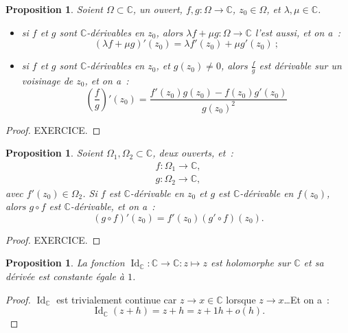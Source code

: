 \documentclass{report}
\newtheorem{prp}[thm]{Proposition}
\theoremstyle{definition}
\theoremstyle{remark}
\numberwithin{equation}{section}
\newcommand{\C}{\mathbb C}
\DeclareMathOperator{\Id}{Id}
\begin{document}
			\begin{prp} Soient $\Omega \subset \C$, un ouvert, $f, g : \Omega \to \C$, $z_0 \in \Omega$, et $\lambda, \mu \in \C$.
			\begin{itemize}
				\item si $f$ et $g$ sont $\C$-dérivables en $z_0$, alors $\lambda f + \mu g : \Omega \to \C$ l'est aussi, et on a~:
				\begin{equation}
					(\lambda f + \mu g)'(z_0) = \lambda f'(z_0) + \mu g'(z_0)~;
				\end{equation}
				\item si $f$ et $g$ sont $\C$-dérivables en $z_0$, et $g(z_0) \neq 0$, alors $\frac fg$ est dérivable sur un voisinage de $z_0$, et on a~:
				\begin{equation}
					\left(\frac fg\right)'(z_0) = \frac {f'(z_0)g(z_0) - f(z_0)g'(z_0)}{g(z_0)^2}
				\end{equation}
			\end{itemize}
			\end{prp}

			\begin{proof} EXERCICE.
			\end{proof}

			\begin{prp} Soient $\Omega_1, \Omega_2 \subset \C$, deux ouverts, et~:
			\begin{align}
				f : \Omega_1 \to \C, \\
				g : \Omega_2 \to \C,
			\end{align}
			avec $f'(z_0) \in \Omega_2$. Si $f$ est $\C$-dérivable en $z_0$ et $g$ est $\C$-dérivable en $f(z_0)$, alors $g \circ f$ est $\C$-dérivable, et on a~:
			\begin{equation}
				(g \circ f)'(z_0) = f'(z_0)(g' \circ f)(z_0).
			\end{equation}
			\end{prp}

			\begin{proof} EXERCICE.
			\end{proof}

			\begin{prp} La fonction $\Id_\C : \C \to \C : z \mapsto z$ est holomorphe sur $\C$ et sa dérivée est constante égale à $1$.
			\end{prp}

			\begin{proof} $\Id_\C$ est trivialement continue car $z \to x \in \C$ lorsque $z \to x$\ldots Et on a~:
			\begin{equation}
				\Id_\C(z+h) = z + h = z + 1h + o(h).
			\end{equation}
			\end{proof}
\end{document}
